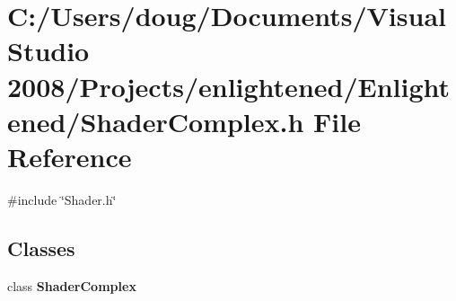 \section{C:/Users/doug/Documents/Visual Studio 2008/Projects/enlightened/Enlightened/ShaderComplex.h File Reference}
\label{_shader_complex_8h}
{\ttfamily \#include \char`\"{}Shader.h\char`\"{}}\par
\subsection*{Classes}
\begin{DoxyCompactItemize}
\item 
class {\bf ShaderComplex}
\end{DoxyCompactItemize}
